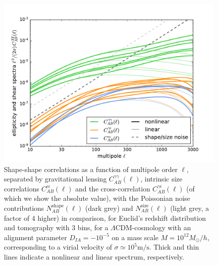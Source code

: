 \documentclass[a4paper,fleqn,usenatbib]{mnras}
\begin{document}
\begin{figure}
\centering
\includegraphics[scale=0.45]{./figures/ia_spectrum.pdf}
\caption{Shape-shape correlations as a function of multipole order $\ell$, separated by gravitational lensing $C_{AB}^{\gamma\gamma}(\ell)$, intrinsic size correlations $C_{AB}^{\epsilon\epsilon}(\ell)$ and the cross-correlation $C_{AB}^{\gamma\epsilon}(\ell)$ (of which we show the absolute value), with the Poissonian noise contributions $N_{AB}^\mathrm{shape}(\ell)$ (dark grey) and $N_{AB}^\mathrm{size}(\ell)$ (light grey, a factor of 4 higher) in comparison, for Euclid's redshift distribution and tomography with 3 bins, for a $\Lambda$CDM-cosmology with an alignment parameter $D_{IA}=-10^{-5}$ on a mass scale $M = 10^{12}M_\odot/h$, corresponding to a virial velocity of $\sigma\simeq10^5\mathrm{m}/\mathrm{s}$. Thick and thin lines indicate a nonlinear and linear spectrum, respectively.}
\label{fig:shapeshape}
\end{figure}
\end{document}
